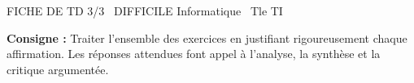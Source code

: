 \documentclass[11pt]{article}
\begin{document}
\begin{tcolorbox}[enhanced,colback=popink,colframe=popink,arc=10pt,boxrule=0pt,left=12pt,right=12pt,top=9pt,bottom=9pt]
{\color{white}\popxbold\small FICHE DE TD 3/3 \textbullet\ DIFFICILE \hfill Informatique \textbullet\ Tle TI\par}
\end{tcolorbox}
\vspace{4pt}
\textbf{Consigne :} Traiter l'ensemble des exercices en justifiant rigoureusement chaque affirmation. Les réponses attendues font appel à l'analyse, la synthèse et la critique argumentée.
\end{document}
